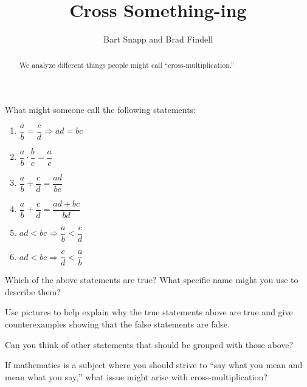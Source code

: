 \documentclass[nooutcomes]{ximera}
\title{Cross Something-ing}
\author{Bart Snapp and Brad Findell}
\begin{document}
\begin{abstract}
  We analyze different things people might call ``cross-multiplication.''
\end{abstract}
\maketitle

\label{A:CrossSomething}


\begin{problem} 
What might someone call the following statements:
\begin{enumerate}
\item $\dfrac{a}{b} = \dfrac{c}{d} \Rightarrow ad = bc$
\item $\dfrac{a}{b}\cdot \dfrac{b}{c} = \dfrac{a}{c}$
\item $\dfrac{a}{b}\div \dfrac{c}{d} = \dfrac{ad}{bc}$
\item $\dfrac{a}{b} +\dfrac{c}{d} = \dfrac{ad+bc}{bd}$
\item $ad < bc \Rightarrow \dfrac{a}{b} < \dfrac{c}{d}$
\item $ad < bc \Rightarrow \dfrac{c}{d} < \dfrac{a}{b}$
\end{enumerate}
\end{problem}

\begin{problem}
Which of the above statements are true? What specific name might you
use to describe them?
\end{problem}

\begin{problem} 
Use pictures to help explain why the true statements above are true
and give counterexamples showing that the false statements are false.
\end{problem}


\begin{problem} 
Can you think of other statements that should be grouped with those
above?
\end{problem}

\begin{problem}
If mathematics is a subject where you should strive to ``say what you
mean and mean what you say,'' what issue might arise with
cross-multiplication?
\end{problem}
\end{document}
